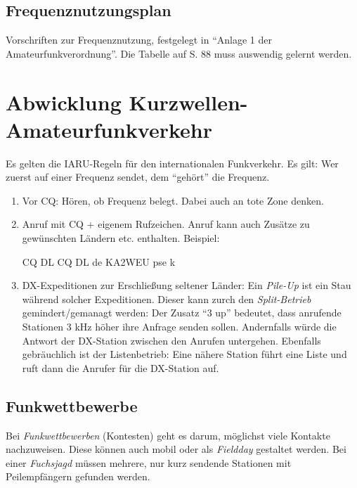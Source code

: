 \documentclass[11pt,BCOR=8.5mm]{scrartcl}
\begin{document}
\subsection{Frequenznutzungsplan}\label{sub:frequenznutzungsplan}
Vorschriften zur Frequenznutzung, festgelegt in "`Anlage 1 der
Amateurfunkverordnung"'. Die Tabelle auf S. 88 muss auswendig gelernt
werden.


\section{Abwicklung Kurzwellen-Amateurfunkverkehr}\label{sec:abwicklung_kurzwellen_amateurfunkverkehr}

Es gelten die IARU-Regeln für den internationalen Funkverkehr. Es gilt:
Wer zuerst auf einer Frequenz sendet, dem "`gehört"' die Frequenz.
\begin{enumerate}
  \item Vor CQ: Hören, ob Frequenz belegt. Dabei auch an tote Zone
    denken.
  \item Anruf mit CQ + eigenem Rufzeichen. Anruf kann auch
    Zusätze zu gewünschten Ländern etc. enthalten. Beispiel:
    \begin{center}
      CQ DL CQ DL de KA2WEU pse k
    \end{center}
  \item DX-Expeditionen zur Erschließung seltener Länder: Ein
    \emph{Pile-Up} ist ein Stau während solcher Expeditionen. Dieser
    kann zurch den \emph{Split-Betrieb} gemindert/gemanagt werden: Der
    Zusatz "`3 up"' bedeutet, dass anrufende Stationen 3 kHz höher ihre
    Anfrage senden sollen. Andernfalls würde die Antwort der DX-Station
    zwischen den Anrufen untergehen. Ebenfalls gebräuchlich ist der
    Listenbetrieb: Eine nähere Station führt eine Liste und ruft dann
    die Anrufer für die DX-Station auf.
\end{enumerate}

\subsection{Funkwettbewerbe}\label{sub:funkwettbewerbe}


Bei \emph{Funkwettbewerben} (Kontesten) geht es darum, möglichst viele Kontakte
nachzuweisen. Diese können auch mobil oder als \emph{Fieldday} gestaltet
werden. Bei einer \emph{Fuchsjagd} müssen mehrere, nur kurz sendende
Stationen mit Peilempfängern gefunden werden.
\end{document}
